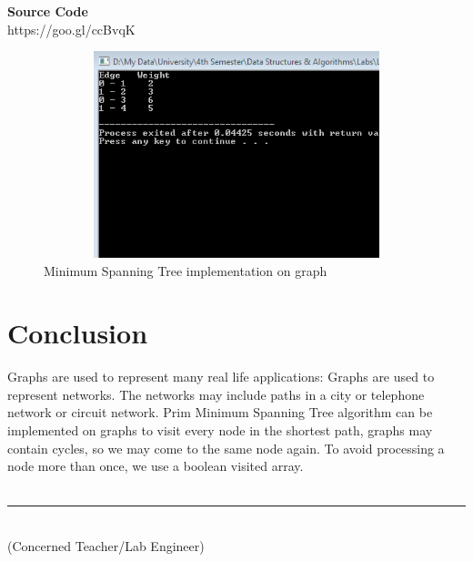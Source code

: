 \documentclass[11pt]{article}            %
\newcommand\tab[1][1cm]{\hspace*{#1}}
\begin{document}
\textbf{Source Code} \\
https://goo.gl/ccBvqK

\begin{figure}[b!]
\centering
  \includegraphics[width=12cm,height=6cm,keepaspectratio]{1.png}
\caption{Minimum Spanning Tree implementation on graph}
\label{Figure:1}    
\end{figure}

\section{Conclusion}
\justify Graphs are used to represent many real life applications: Graphs are used to represent networks. The networks may include paths in a city or telephone network or circuit network. Prim Minimum Spanning Tree algorithm can be implemented on graphs to visit every node in the shortest path, graphs may contain cycles, so we may come to the same node again. To avoid processing a node more than once, we use a boolean visited array.\\~\\

\tab[6cm] \noindent\rule{6cm}{0.4pt}\\
\tab[6cm] (Concerned Teacher/Lab Engineer)


 
\end{document}
